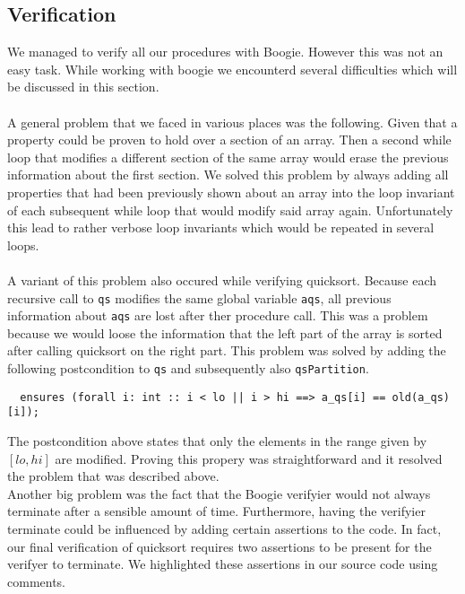 \subsection{Verification}

We managed to verify all our procedures with Boogie. However this was not an easy task. While working 
with boogie we encounterd several difficulties which will be discussed in this section.\\\\

A general problem that we faced in various places was the following. Given that a property could be proven
to hold over a section of an array. Then a second while loop that modifies a different section of the same array
would erase the previous information about the first section. We solved this problem by always adding all properties that
had been previously shown about an array into the loop invariant of each subsequent while loop that would modify 
said array again. Unfortunately this lead to rather verbose loop invariants which would be 
repeated in several loops.
\\\\
A variant of this problem also occured while verifying quicksort. Because each recursive call 
to \texttt{qs} modifies the same global variable \texttt{a\+qs}, all previous information about \texttt{a\+qs} 
are lost after ther procedure call. This was a problem because we would loose the information that the left
part of the array is sorted after calling quicksort on the right part. 
This problem was solved by adding the following postcondition to \texttt{qs} and subsequently also \texttt{qsPartition}.

\begin{verbatim}
  ensures (forall i: int :: i < lo || i > hi ==> a_qs[i] == old(a_qs)[i]);
\end{verbatim}

The postcondition above states that only the elements in the range given by $[lo, hi]$ are modified. Proving this
propery was straightforward and it resolved the problem that was described above.\\

Another big problem was the fact that the Boogie verifyier would not always terminate after a 
sensible amount of time. Furthermore, having the verifyier terminate could be influenced by
adding certain assertions to the code. In fact, our final verification of quicksort requires
two assertions to be present for the verifyer to terminate. We highlighted these assertions in our
source code using comments.\\

